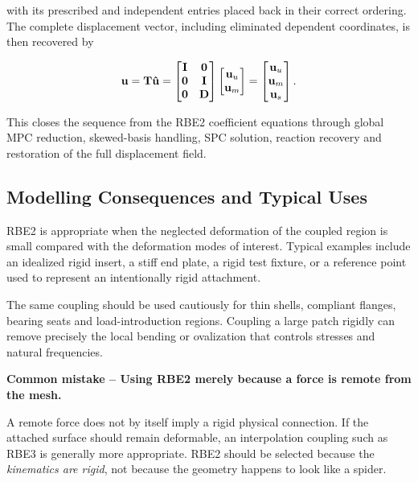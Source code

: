 with its prescribed and independent entries placed back in their correct
ordering. The complete displacement vector, including eliminated dependent
coordinates, is then recovered by

\begin{equation}
    \mathbf{u}=\mathbf{T}\mathbf{\hat u}
    =
    \begin{bmatrix}
        \mathbf{I}&\mathbf{0}\\
        \mathbf{0}&\mathbf{I}\\
        \mathbf{0}&\mathbf{D}
    \end{bmatrix}
    \begin{bmatrix}\mathbf{u}_u\\\mathbf{u}_m\end{bmatrix}
    =
    \begin{bmatrix}\mathbf{u}_u\\\mathbf{u}_m\\\mathbf{u}_s\end{bmatrix}.
\end{equation}

This closes the sequence from the RBE2 coefficient equations through global MPC
reduction, skewed-basis handling, SPC solution, reaction recovery and restoration
of the full displacement field.

\subsection{Modelling Consequences and Typical Uses}

RBE2 is appropriate when the neglected deformation of the coupled region is
small compared with the deformation modes of interest. Typical examples include
an idealized rigid insert, a stiff end plate, a rigid test fixture, or a reference
point used to represent an intentionally rigid attachment.

The same coupling should be used cautiously for thin shells, compliant flanges,
bearing seats and load-introduction regions. Coupling a large patch rigidly can
remove precisely the local bending or ovalization that controls stresses and
natural frequencies.

\begin{bbox}
\textbf{Common mistake -- Using RBE2 merely because a force is remote from the mesh.}

A remote force does not by itself imply a rigid physical connection. If the
attached surface should remain deformable, an interpolation coupling such as
RBE3 is generally more appropriate. RBE2 should be selected because the
\textit{kinematics are rigid}, not because the geometry happens to look like a
spider.
\end{bbox}

